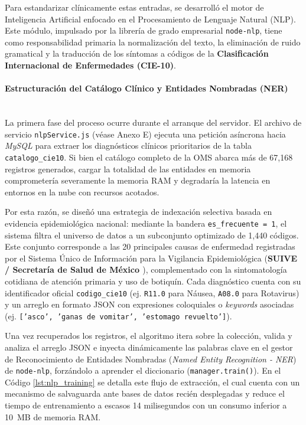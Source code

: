 Para estandarizar clínicamente estas entradas, se desarrolló el motor de Inteligencia Artificial enfocado en el Procesamiento de Lenguaje Natural (NLP). Este módulo, impulsado por la librería de grado empresarial \texttt{node-nlp}, tiene como responsabilidad primaria la normalización del texto, la eliminación de ruido gramatical y la traducción de los síntomas a códigos de la \textbf{Clasificación Internacional de Enfermedades (CIE-10)}.

\paragraph{Estructuración del Catálogo Clínico y Entidades Nombradas (NER)} \leavevmode \\
La primera fase del proceso ocurre durante el arranque del servidor. El archivo de servicio \texttt{nlpService.js} (véase Anexo E) ejecuta una petición asíncrona hacia \emph{MySQL} para extraer los diagnósticos clínicos prioritarios de la tabla \texttt{catalogo\_cie10}. Si bien el catálogo completo de la OMS abarca más de 67,168 registros generados, cargar la totalidad de las entidades en memoria comprometería severamente la memoria RAM y degradaría la latencia en entornos en la nube con recursos acotados.

Por esta razón, se diseñó una estrategia de indexación selectiva basada en evidencia epidemiológica nacional: mediante la bandera \texttt{es\_frecuente = 1}, el sistema filtra el universo de datos a un subconjunto optimizado de 1,440 códigos. Este conjunto corresponde a las 20 principales causas de enfermedad registradas por el Sistema Único de Información para la Vigilancia Epidemiológica (\textbf{SUIVE / Secretaría de Salud de México \cite{DGE_Morbilidad}}), complementado con la sintomatología cotidiana de atención primaria y uso de botiquín. Cada diagnóstico cuenta con su identificador oficial \texttt{codigo\_cie10} (ej. \texttt{R11.0} para Náusea, \texttt{A08.0} para Rotavirus) y un arreglo en formato JSON con expresiones coloquiales o \emph{keywords} asociadas (ej. \texttt{['asco', 'ganas de vomitar', 'estomago revuelto']}).

Una vez recuperados los registros, el algoritmo itera sobre la colección, valida y analiza el arreglo JSON e inyecta dinámicamente las palabras clave en el gestor de Reconocimiento de Entidades Nombradas (\emph{Named Entity Recognition - NER}) de \texttt{node-nlp}, forzándolo a aprender el diccionario (\texttt{manager.train()}). En el Código \ref{lst:nlp_training} se detalla este flujo de extracción, el cual cuenta con un mecanismo de salvaguarda ante bases de datos recién desplegadas y reduce el tiempo de entrenamiento a escasos 14 milisegundos con un consumo inferior a 10~MB de memoria RAM.

